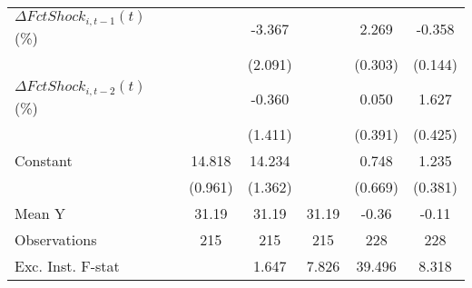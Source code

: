 {\begin{tabular}{l*{5}{c}}
\addlinespace
$ \Delta FctShock_{i,t-1}(t)$ (\%)&                     &      -3.367         &                     &       2.269\sym{***}&      -0.358\sym{**} \\
                    &                     &     (2.091)         &                     &     (0.303)         &     (0.144)         \\
\addlinespace
$ \Delta FctShock_{i,t-2}(t)$ (\%)&                     &      -0.360         &                     &       0.050         &       1.627\sym{***}\\
                    &                     &     (1.411)         &                     &     (0.391)         &     (0.425)         \\
\addlinespace
Constant            &      14.818\sym{***}&      14.234\sym{***}&                     &       0.748         &       1.235\sym{***}\\
                    &     (0.961)         &     (1.362)         &                     &     (0.669)         &     (0.381)         \\
\midrule
Mean Y              &       31.19         &       31.19         &       31.19         &       -0.36         &       -0.11         \\
Observations        &         215         &         215         &         215         &         228         &         228         \\
Exc. Inst. F-stat   &                     &       1.647         &       7.826         &      39.496         &       8.318         \\
\bottomrule
\end{tabular}
}
